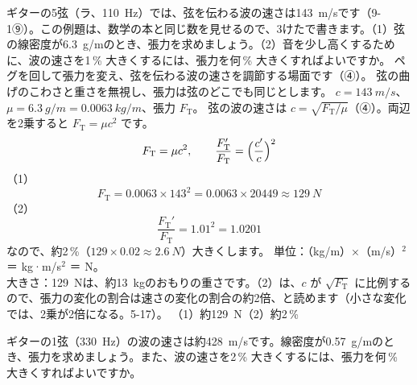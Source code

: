 \label{ph:波-5:ex7}
\begin{phreidai}[ギターの弦の張力]
ギターの5弦（ラ、\qty{110}{Hz}）では、弦を伝わる波の速さは\qty{143}{m/s}です（9-1⑨）。この例題は、数学の本と同じ数を見せるので、3けたで書きます。（1）弦の線密度が\qty{6.3}{g/m}のとき、張力を求めましょう。（2）音を少し高くするために、波の速さを1\,\% 大きくするには、張力を何\,\% 大きくすればよいですか。
\phbamen
ペグを回して張力を変え、弦を伝わる波の速さを調節する場面です（④）。
\phmushi
弦の曲げのこわさと重さを無視し、張力は弦のどこでも同じとします。
\phzu
$c=\qty{143}{m/s}$、$\mu=\qty{6.3}{g/m}=\qty{0.0063}{kg/m}$、張力 $F_{\mathrm T}$。
\phriyu
弦の波の速さは $c=\sqrt{F_{\mathrm T}/\mu}$（④）。両辺を2乗すると $F_{\mathrm T}=\mu c^2$ です。
\phtateru
\[F_{\mathrm T}=\mu c^2,\qquad\frac{F_{\mathrm T}'}{F_{\mathrm T}}=\Bigl(\frac{c'}{c}\Bigr)^2\]
\phtoku
（1）\[F_{\mathrm T}=0.0063\times143^2=0.0063\times\num{20449}\approx\qty{129}{N}\]
（2）\[\frac{F_{\mathrm T}'}{F_{\mathrm T}}=1.01^2=1.0201\]
なので、約2\,\%（$129\times0.02\approx\qty{2.6}{N}$）大きくします。
\phtashikame
単位：（kg/m）×（m/s）$^2$ ＝ kg·m/s$^2$ ＝ N。\\
大きさ：\qty{129}{N}は、約\qty{13}{kg}のおもりの重さです。（2）は、$c$ が $\sqrt{F_{\mathrm T}}$ に比例するので、張力の変化の割合は速さの変化の割合の約2倍、と読めます（小さな変化では、2乗が2倍になる。5-17）。
\kotae （1）約\qty{129}{N}（2）約2\,\%
\end{phreidai}
\begin{jibun}
ギターの1弦（\qty{330}{Hz}）の波の速さは約\qty{428}{m/s}です。線密度が\qty{0.57}{g/m}のとき、張力を求めましょう。また、波の速さを2\,\% 大きくするには、張力を何\,\% 大きくすればよいですか。
\end{jibun}

